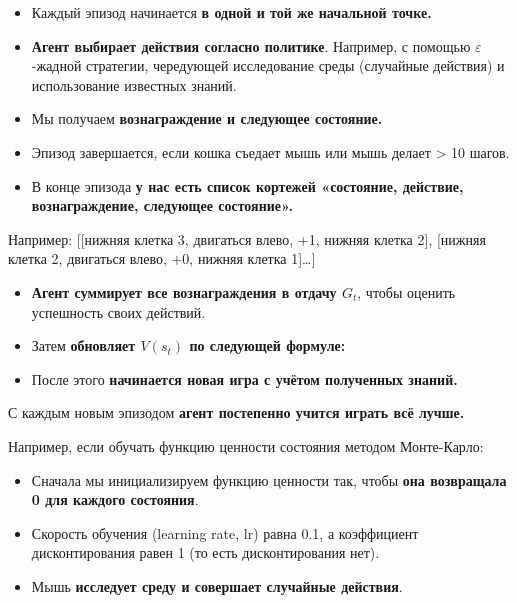 \documentclass[11pt,a4paper]{article}
\begin{document}
\begin{itemize}
\item
  Каждый эпизод начинается \textbf{в одной и той же начальной точке.}
\item
  \textbf{Агент выбирает действия согласно политике}. Например, с помощью \(\varepsilon\)-жадной стратегии, чередующей исследование среды (случайные действия) и использование известных знаний.
\item
  Мы получаем \textbf{вознаграждение и следующее состояние.}
\item
  Эпизод завершается, если кошка съедает мышь или мышь делает \textgreater{} 10 шагов.
\item
  В конце эпизода \textbf{у нас есть список кортежей «состояние, действие, вознаграждение, следующее состояние».}
\end{itemize}

Например: {[}{[}нижняя клетка 3, двигаться влево, +1, нижняя клетка 2{]}, {[}нижняя клетка 2, двигаться влево, +0, нижняя клетка 1{]}\ldots{]}

\begin{itemize}
\tightlist
\item
  \textbf{Агент суммирует все вознаграждения в отдачу \(G_t\)}, чтобы оценить успешность своих действий.
\item
  Затем \textbf{обновляет \(V(s_t)\) по следующей формуле:}
\end{itemize}


\begin{itemize}
\tightlist
\item
  После этого \textbf{начинается новая игра с учётом полученных знаний.}
\end{itemize}

С каждым новым эпизодом \textbf{агент постепенно учится играть всё лучше.}


Например, если обучать функцию ценности состояния методом Монте-Карло:

\begin{itemize}
\tightlist
\item
  Сначала мы инициализируем функцию ценности так, чтобы \textbf{она возвращала 0 для каждого состояния}.
\item
  Скорость обучения (learning rate, lr) равна 0.1, а коэффициент дисконтирования равен 1 (то есть дисконтирования нет).
\item
  Мышь \textbf{исследует среду и совершает случайные действия}.
\end{itemize}
\end{document}
